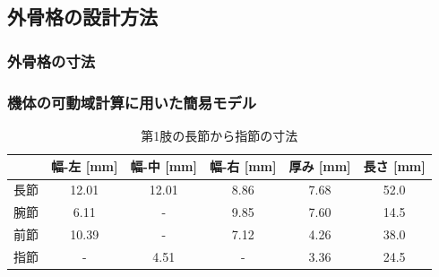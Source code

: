 \subsection{外骨格の設計方法}
\subsubsection{外骨格の寸法}

\subsubsection{機体の可動域計算に用いた簡易モデル}

\begin{table}[htbp]
  \centering
  \caption{第1肢の長節から指節の寸法}
  \label{tab:1setu}
  \vspace{-3mm}
  \begin{tabular}{|l|c|c|c|c|c|}
  \hline
     & \multicolumn{1}{l|}{幅-左 [mm]} & \multicolumn{1}{l|}{幅-中 [mm]} & \multicolumn{1}{l|}{幅-右 [mm]} & \multicolumn{1}{l|}{厚み [mm]} & \multicolumn{1}{l|}{長さ [mm]} \\ \hline
  長節 & 12.01                       & 12.01                       & 8.86                        & 7.68                        & 52.0                        \\ \hline
  腕節 & 6.11                        & -                           & 9.85                        & 7.60                        & 14.5                        \\ \hline
  前節 & 10.39                       & -                           & 7.12                        & 4.26                        & 38.0                        \\ \hline
  指節 & -                           & 4.51                        & -                           & 3.36                        & 24.5                        \\ \hline
  \end{tabular}
\end{table}
%
